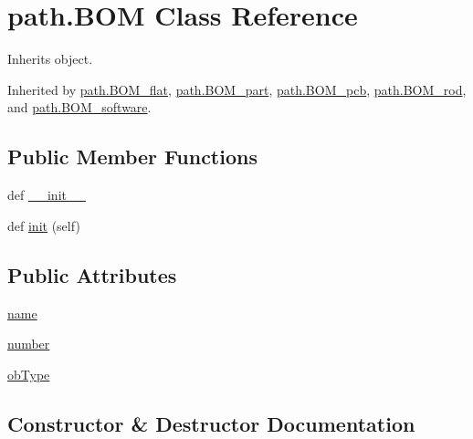 \hypertarget{classpath_1_1_b_o_m}{}\section{path.\+B\+O\+M Class Reference}
\label{classpath_1_1_b_o_m}


Inherits object.



Inherited by \hyperlink{classpath_1_1_b_o_m__flat}{path.\+B\+O\+M\+\_\+flat}, \hyperlink{classpath_1_1_b_o_m__part}{path.\+B\+O\+M\+\_\+part}, \hyperlink{classpath_1_1_b_o_m__pcb}{path.\+B\+O\+M\+\_\+pcb}, \hyperlink{classpath_1_1_b_o_m__rod}{path.\+B\+O\+M\+\_\+rod}, and \hyperlink{classpath_1_1_b_o_m__software}{path.\+B\+O\+M\+\_\+software}.

\subsection*{Public Member Functions}
\begin{DoxyCompactItemize}
\item 
def \hyperlink{classpath_1_1_b_o_m_ac3d7521a63ca62ccb1501290be173138}{\+\_\+\+\_\+init\+\_\+\+\_\+}
\item 
def \hyperlink{classpath_1_1_b_o_m_abc415a791d6d61925fbcb7147b9f7d9a}{init} (self)
\end{DoxyCompactItemize}
\subsection*{Public Attributes}
\begin{DoxyCompactItemize}
\item 
\hyperlink{classpath_1_1_b_o_m_ac3b3f760b4c57931b482e634daeb2777}{name}
\item 
\hyperlink{classpath_1_1_b_o_m_a385db7437e8e98aef75fa24a98f390e4}{number}
\item 
\hyperlink{classpath_1_1_b_o_m_a5748ce4bbb6dfa779752d97f0bee55d2}{ob\+Type}
\end{DoxyCompactItemize}


\subsection{Constructor \& Destructor Documentation}
\hypertarget{classpath_1_1_b_o_m_ac3d7521a63ca62ccb1501290be173138}{}
